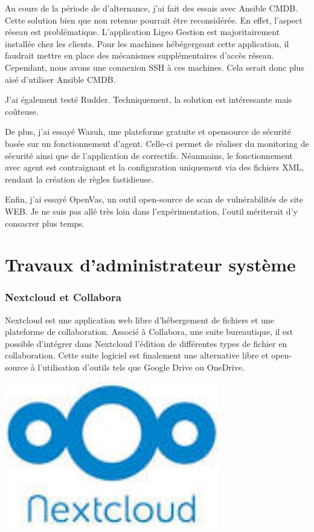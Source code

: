 \documentclass[12pt, a4paper, twoside]{article}
\begin{document}
Au cours de la période de d'alternance, j'ai fait des essais avec \gls{Ansible CMDB}. 
Cette solution bien que non retenue pourrait être reconsidérée. 
En effet, l'aspect réseau est problématique.
L'application Ligeo Gestion est majoritairement installée chez les clients.
Pour les machines hébégergeant cette application, il faudrait mettre en place des mécanismes supplémentaires d'accès réseau.
Cependant, nous avons une connexion SSH à ces machines.
Cela serait donc plus aisé d'utiliser \gls{Ansible CMDB}.

J'ai également testé Rudder.
Techniquement, la solution est intéressante mais coûteuse.

De plus, j'ai essayé Wazuh, une plateforme gratuite et opensource de sécurité basée sur un fonctionnement d'agent. 
Celle-ci permet de réaliser du monitoring de sécurité ainsi que de l'application de correctifs.
Néanmoins, le fonctionnement avec agent est contraignant et la configuration uniquement via des fichiers XML, rendant la création de règles fastidieuse.

Enfin, j'ai essayé OpenVas, un outil open-source de scan de vulnérabilités de site WEB.
Je ne suis pas allé très loin dans l'expérimentation, l'outil mériterait d'y consacrer plus temps.

\newpage
\part{Travaux d'administrateur système}
\section{Nextcloud et Collabora}
\noindent%
\begin{minipage}{.7\textwidth}%
\gls{Nextcloud} est une application web libre d'hébergement de fichiers et une plateforme de collaboration. 
Associé à \gls{Collabora}, une suite bureautique, il est possible d'intégrer dans \gls{Nextcloud} l'édition de différentes types de fichier en collaboration. 
Cette suite logiciel est finalement une alternative libre et open-source à l'utilisation d'outils tels que Google Drive ou OneDrive.
\end{minipage}%
\hfill
\begin{minipage}{.3\textwidth}%
\begin{center}
\includegraphics[width=0.7\textwidth]{src/logo_nextcloud.jpeg}
\end{center}
\end{minipage}%
\end{document}
